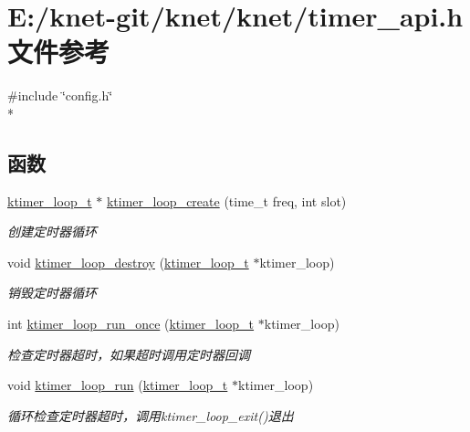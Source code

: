 \hypertarget{a00096}{}\section{E\+:/knet-\/git/knet/knet/timer\+\_\+api.h 文件参考}
\label{a00096}
{\ttfamily \#include \char`\"{}config.\+h\char`\"{}}\\*
\subsection*{函数}
\begin{DoxyCompactItemize}
\item 
\hyperlink{a00050_a024af2aa29615e7a811ea6c45438157d_a024af2aa29615e7a811ea6c45438157d}{ktimer\+\_\+loop\+\_\+t} $\ast$ \hyperlink{a00109_gaef96e7c368db456236a2121e3d75c49c_gaef96e7c368db456236a2121e3d75c49c}{ktimer\+\_\+loop\+\_\+create} (time\+\_\+t freq, int slot)
\begin{DoxyCompactList}\small\item\em 创建定时器循环 \end{DoxyCompactList}\item 
void \hyperlink{a00109_gad3dafe93f5b45424bd5983ef0c163687_gad3dafe93f5b45424bd5983ef0c163687}{ktimer\+\_\+loop\+\_\+destroy} (\hyperlink{a00050_a024af2aa29615e7a811ea6c45438157d_a024af2aa29615e7a811ea6c45438157d}{ktimer\+\_\+loop\+\_\+t} $\ast$ktimer\+\_\+loop)
\begin{DoxyCompactList}\small\item\em 销毁定时器循环 \end{DoxyCompactList}\item 
int \hyperlink{a00109_gaf195cf4006bced494e99242c36ad36c0_gaf195cf4006bced494e99242c36ad36c0}{ktimer\+\_\+loop\+\_\+run\+\_\+once} (\hyperlink{a00050_a024af2aa29615e7a811ea6c45438157d_a024af2aa29615e7a811ea6c45438157d}{ktimer\+\_\+loop\+\_\+t} $\ast$ktimer\+\_\+loop)
\begin{DoxyCompactList}\small\item\em 检查定时器超时，如果超时调用定时器回调 \end{DoxyCompactList}\item 
void \hyperlink{a00109_ga5e31b2fc26af005e97b09804c5a98099_ga5e31b2fc26af005e97b09804c5a98099}{ktimer\+\_\+loop\+\_\+run} (\hyperlink{a00050_a024af2aa29615e7a811ea6c45438157d_a024af2aa29615e7a811ea6c45438157d}{ktimer\+\_\+loop\+\_\+t} $\ast$ktimer\+\_\+loop)
\begin{DoxyCompactList}\small\item\em 循环检查定时器超时，调用ktimer\+\_\+loop\+\_\+exit()退出 \end{DoxyCompactList}\item 

\end{DoxyCompactItemize}
